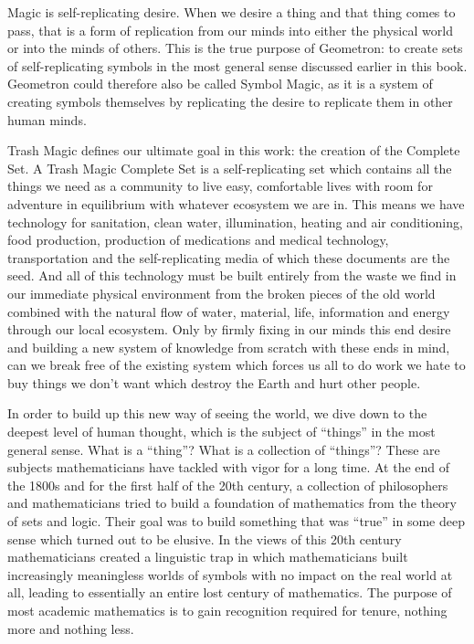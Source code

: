 
Magic is self-replicating desire.  When we desire a thing and that thing comes to pass, that is a form of replication from our minds into either the physical world or into the minds of others.  This is the true purpose of Geometron: to create sets of self-replicating symbols in the most general sense discussed earlier in this book.  Geometron could therefore also be called Symbol Magic, as it is a system of creating symbols themselves by replicating the desire to replicate them in other human minds.

Trash Magic defines our ultimate goal in this work: the creation of the Complete Set.  A Trash Magic Complete Set is a self-replicating set which contains all the things we need as a community to live easy, comfortable lives with room for adventure in equilibrium with whatever ecosystem we are in.  This means we have technology for sanitation, clean water, illumination, heating and air conditioning, food production, production of medications and medical technology, transportation and the self-replicating media of which these documents are the seed.  And all of this technology must be built entirely from the waste we find in our immediate physical environment from the broken pieces of the old world combined with the natural flow of water, material, life, information and energy through our local ecosystem.  Only by firmly fixing in our minds this end desire and building a new system of knowledge from scratch with these ends in mind, can we break free of the existing system which forces us all to do work we hate to buy things we don't want which destroy the Earth and hurt other people. 

In order to build up this new way of seeing the world, we dive down to the deepest level of human thought, which is the subject of ``things'' in the most general sense.  What is a ``thing''? What is a collection of ``things''?  These are subjects mathematicians have tackled with vigor for a long time.  At the end of the 1800s and for the first half of the 20th century,  a collection of philosophers and mathematicians tried to build a foundation of mathematics from the theory of sets and logic.  Their goal was to build something that was ``true'' in some deep sense which turned out to be elusive.  In the views of this 20th century mathematicians created a linguistic trap in which mathematicians built increasingly meaningless worlds of symbols with no impact on the real world at all, leading to essentially an entire lost century of mathematics.  The purpose of most academic mathematics is to gain recognition required for tenure, nothing more and nothing less.


